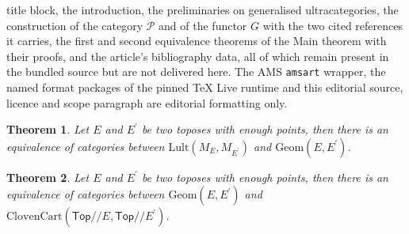 \documentclass[10pt,a4paper]{amsart}
\newtheorem{theorem}{Theorem}[section]
\newtheorem*{Notation Convention*}{Notation Convention}
\newcommand{\la}[1]{\mathrm{#1}}
\newcommand{\ca}[1]{\mathcal{#1}}
\newcommand{\cat}[1]{\mathsf{#1}}
\begin{document}
title block, the introduction, the preliminaries on generalised ultracategories, the construction of the category $\ca{P}$ and of the functor $G$ with the two cited references it carries, the first and second equivalence theorems of the Main theorem with their proofs, and the article's bibliography data, all of which remain present in the bundled source but are not delivered here. The AMS \texttt{amsart} wrapper, the named format packages of the pinned TeX Live runtime and this editorial source, licence and scope paragraph are editorial formatting only.\par\smallskip
\setcounter{section}{7}
\setcounter{equation}{0}
\setcounter{corollary}{0}
\setcounter{note}{0}
\setcounter{theorem}{0}
\begin{theorem} 
\label{Main theorem}
    Let $E$ and $E^{'}$ be two toposes with enough points, then there is an equivalence of categories between $\mathrm{Lult}(M_{E}, M_{E^{'}})$ and $\mathrm{Geom}(E,E^{'})$.
\end{theorem}

\setcounter{section}{7}
\setcounter{equation}{0}
\setcounter{corollary}{0}
\setcounter{note}{0}
\setcounter{theorem}{5}
\begin{theorem}
    Let $E$ and $E^{'}$ be two toposes with enough points, then there is an equivalence of categories between $\la{Geom}(E,E^{'})$ and $\la{ClovenCart}(\cat{Top}//E, \cat{Top}//E^{'})$.\label{third equivalence theorem}
\end{theorem}
\end{document}
